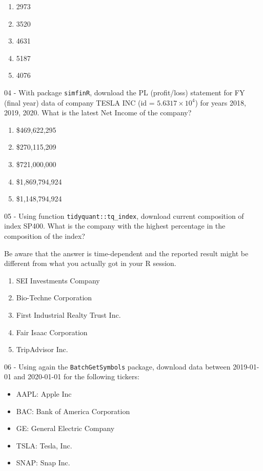 \documentclass[
  12pt,
]{book}
\providecommand{\tightlist}{%
  \setlength{\itemsep}{0pt}\setlength{\parskip}{0pt}}
\begin{document}
\begin{enumerate}
\def\labelenumi{\alph{enumi})}
\tightlist
\item
  2973
\item
  3520
\item
  4631
\item
  5187
\item
  4076
\end{enumerate}

04 -
With package \texttt{simfinR}, download the PL (profit/loss) statement for FY (final year) data of company TESLA INC (id = \ensuremath{5.6317\times 10^{4}}) for years 2018, 2019, 2020. What is the latest Net Income of the company?

\begin{enumerate}
\def\labelenumi{\alph{enumi})}
\tightlist
\item
  \$469,622,295
\item
  \$270,115,209
\item
  \$721,000,000
\item
  \$1,869,794,924
\item
  \$1,148,794,924
\end{enumerate}

05 -
Using function \texttt{tidyquant::tq\_index}, download current composition of index SP400. What is the company with the highest percentage in the composition of the index?

Be aware that the answer is time-dependent and the reported result might be different from what you actually got in your R session.

\begin{enumerate}
\def\labelenumi{\alph{enumi})}
\tightlist
\item
  SEI Investments Company
\item
  Bio-Techne Corporation
\item
  First Industrial Realty Trust Inc.
\item
  Fair Isaac Corporation
\item
  TripAdvisor Inc.
\end{enumerate}

06 -
Using again the \texttt{BatchGetSymbols} package, download data between 2019-01-01 and 2020-01-01 for the following tickers:

\begin{itemize}
\tightlist
\item
  AAPL: Apple Inc
\item
  BAC: Bank of America Corporation
\item
  GE: General Electric Company
\item
  TSLA: Tesla, Inc.
\item
  SNAP: Snap Inc.
\end{itemize}
\end{document}
